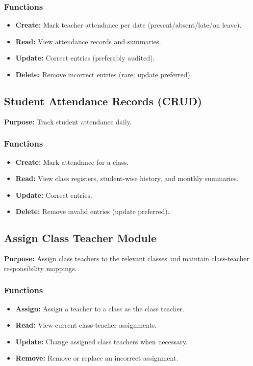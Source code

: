 \documentclass[12pt, a4paper]{report}
\begin{document}
\subsubsection*{Functions}
\begin{itemize}[leftmargin=*]
  \item \textbf{Create:} Mark teacher attendance per date (present/absent/late/on leave).
  \item \textbf{Read:} View attendance records and summaries.
  \item \textbf{Update:} Correct entries (preferably audited).
  \item \textbf{Delete:} Remove incorrect entries (rare; update preferred).
\end{itemize}

\subsection{Student Attendance Records (CRUD)}
\textbf{Purpose:} Track student attendance daily.

\subsubsection*{Functions}
\begin{itemize}[leftmargin=*]
  \item \textbf{Create:} Mark attendance for a class.
  \item \textbf{Read:} View class registers, student-wise history, and monthly summaries.
  \item \textbf{Update:} Correct entries.
  \item \textbf{Delete:} Remove invalid entries (update preferred).
\end{itemize}

\subsection{Assign Class Teacher Module}
\textbf{Purpose:} Assign class teachers to the relevant classes and maintain class-teacher responsibility mappings.

\subsubsection*{Functions}
\begin{itemize}[leftmargin=*]
  \item \textbf{Assign:} Assign a teacher to a class as the class teacher.
  \item \textbf{Read:} View current class-teacher assignments.
  \item \textbf{Update:} Change assigned class teachers when necessary.
  \item \textbf{Remove:} Remove or replace an incorrect assignment.
\end{itemize}
\end{document}
